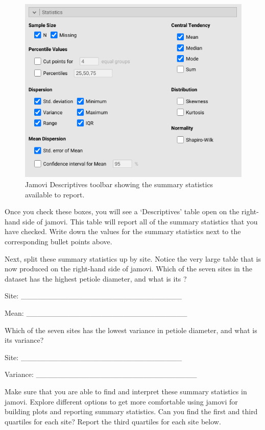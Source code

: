 \documentclass[
  openany]{krantz}
\begin{document}
\begin{figure}
\includegraphics[width=1\linewidth]{img/lilypad_summary_statistics} \caption{Jamovi Descriptives toolbar showing the summary statistics available to report.}\label{fig:unnamed-chunk-49}
\end{figure}

Once you check these boxes, you will see a `Descriptives' table open on the right-hand side of jamovi.
This table will report all of the summary statistics that you have checked.
Write down the values for the summary statistics next to the corresponding bullet points above.

Next, split these summary statistics up by site.
Notice the very large table that is now produced on the right-hand side of jamovi.
Which of the seven sites in the dataset has the highest  petiole diameter, and what is its ?

Site: \_\_\_\_\_\_\_\_\_\_\_\_\_\_\_\_\_\_\_\_\_\_\_\_\_\_\_\_\_\_

Mean: \_\_\_\_\_\_\_\_\_\_\_\_\_\_\_\_\_\_\_\_\_\_\_\_\_\_\_\_\_\_

Which of the seven sites has the lowest variance in petiole diameter, and what is its variance?

Site: \_\_\_\_\_\_\_\_\_\_\_\_\_\_\_\_\_\_\_\_\_\_\_\_\_\_\_\_\_\_

Variance: \_\_\_\_\_\_\_\_\_\_\_\_\_\_\_\_\_\_\_\_\_\_\_\_\_\_\_\_\_\_

Make sure that you are able to find and interpret these summary statistics in jamovi.
Explore different options to get more comfortable using jamovi for building plots and reporting summary statistics.
Can you find the first and third quartiles for each site?
Report the third quartiles for each site below.
\end{document}
